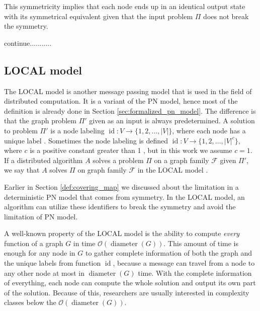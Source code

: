 

This symmetricity implies that each node ends up in an identical output state with its symmetrical equivalent given that the input problem $\Pi$ does not break the symmetry.

continue...........

\subsection{LOCAL model} \label{sec:local_model}
The LOCAL model is another message passing model that is used in the field of distributed computation.
It is a variant of the PN model, hence most of the definition is already done in Section \ref{sec:formalized_pn_model}.
The difference is that the graph problem $\Pi'$ given as an input is always predetermined.
A solution to problem $\Pi'$ is a node labeling $\operatorname{id}\colon V \rightarrow \{1,2,\dotsc,|V|\}$, where each node has a unique label \cite{DBLP:conf/focs/Linial87}.
Sometimes the node labeling is defined $\operatorname{id}\colon V \rightarrow \{1,2,\dotsc,|V|^c\}$, where $c$ is a positive constant greater than 1 \cite{HirvonenSuomelaDistAlg2020}, but in this work we assume $c=1$.
If a distributed algorithm $A$ solves a problem $\Pi$ on a graph family $\mathcal{F}$ given $\Pi'$, we say that $A$ solves $\Pi$ on graph family $\mathcal{F}$ in the LOCAL model \cite{HirvonenSuomelaDistAlg2020}.

Earlier in Section \ref{def:covering_map} we discussed about the limitation in a deterministic PN model that comes from symmetry.
In the LOCAL model, an algorithm can utilize these identifiers to break the symmetry and avoid the limitation of PN model.

A well-known property of the LOCAL model is the ability to compute \emph{every} function of a graph $G$ in time $\mathcal{O}(\operatorname{diameter}(G))$.
This amount of time is enough for any node in $G$ to gather complete information of both the graph and the unique labels from function $\operatorname{id}$, because a message can travel from a node to any other node at most in $\operatorname{diameter}(G)$ time.
With the complete information of everything, each node can compute the whole solution and output its own part of the solution.
Because of this, researchers are usually interested in complexity classes below the $\mathcal{O}(\operatorname{diameter}(G))$.

